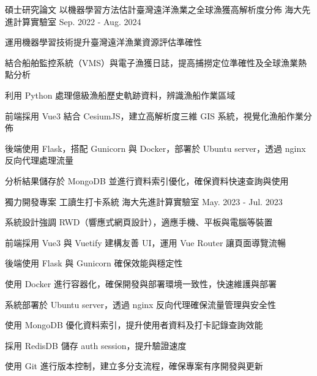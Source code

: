 

\begin{cventries}

  \cventry
    {碩士研究論文} %
    {以機器學習方法估計臺灣遠洋漁業之全球漁獲高解析度分佈} %
    {海大先進計算實驗室} %
    {Sep. 2022 - Aug. 2024} %
    {
      \begin{cvitems} %
        \item {運用機器學習技術提升臺灣遠洋漁業資源評估準確性}
        \item {結合船舶監控系統（VMS）與電子漁獲日誌，提高捕撈定位準確性及全球漁業熱點分析}
        \item {利用 Python 處理億級漁船歷史軌跡資料，辨識漁船作業區域}
        \item {前端採用 Vue3 結合 CesiumJS，建立高解析度三維 GIS 系統，視覺化漁船作業分佈}
        \item {後端使用 Flask，搭配 Gunicorn 與 Docker，部署於 Ubuntu server，透過 nginx 反向代理處理流量}
        \item {分析結果儲存於 MongoDB 並進行資料索引優化，確保資料快速查詢與使用}
      \end{cvitems}
    }

  \cventry
    {獨力開發專案} %
    {工讀生打卡系統} %
    {海大先進計算實驗室} %
    {May. 2023 - Jul. 2023} %
    {
      \begin{cvitems} %
        \item{系統設計強調 RWD（響應式網頁設計），適應手機、平板與電腦等裝置}
        \item{前端採用 Vue3 與 Vuetify 建構友善 UI，運用 Vue Router 讓頁面導覽流暢}
        \item{後端使用 Flask 與 Gunicorn 確保效能與穩定性}
        \item{使用 Docker 進行容器化，確保開發與部署環境一致性，快速維護與部署}
        \item{系統部署於 Ubuntu server，透過 nginx 反向代理確保流量管理與安全性}
        \item{使用 MongoDB 優化資料索引，提升使用者資料及打卡記錄查詢效能}
        \item{採用 RedisDB 儲存 auth session，提升驗證速度}
        \item{使用 Git 進行版本控制，建立多分支流程，確保專案有序開發與更新}
      \end{cvitems}
    }


\end{cventries}
